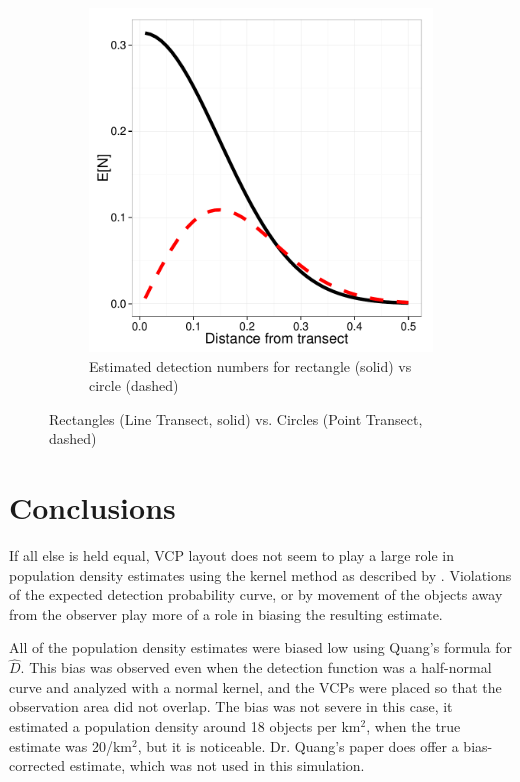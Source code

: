 \documentclass[12pt]{article}
\begin{document}
\begin{figure}
\begin{subfigure}[b]{0.45\textwidth}
		\includegraphics[width=\textwidth]{../images/rect-circ-detection.pdf}
		\caption{Estimated detection numbers for rectangle (solid) vs circle (dashed)}
		\label{fig:perfectCount}
	\end{subfigure}
	\caption{Rectangles (Line Transect, solid) vs. Circles (Point Transect, dashed)}
	\label{fig:linevs}
\end{figure}


\section{Conclusions}
If all else is held equal, VCP layout does not seem to play a large role in population density estimates using the kernel method as described by \textcite{quang1993}. Violations of the expected detection probability curve, or by movement of the objects away from the observer play more of a role in biasing the resulting estimate. 

All of the population density estimates were biased low using Quang's formula for $\hat{D}$. This bias was observed even when the detection function was a half-normal curve and analyzed with a normal kernel, and the VCPs were placed so that the observation area did not overlap. The bias was not severe in this case, it estimated a population density around 18 objects per km$^2$, when the true estimate was 20/km$^2$, but it is noticeable. Dr. Quang's paper does offer a bias-corrected estimate, which was not used in this simulation. 
\end{document}
